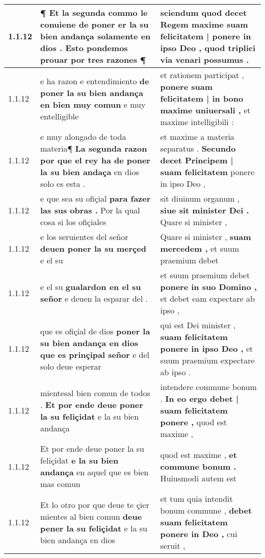 \begin{tabular}{|p{1cm}|p{6.5cm}|p{6.5cm}|}
1.1.12 & ¶ Et la segunda commo le conuiene \textbf{ de poner er la su bien andança solamente en dios . } Esto pondemos prouar por tres razones ¶ & sciendum quod decet Regem maxime \textbf{ suam felicitatem | ponere in ipso Deo , } quod triplici via venari possumus . \\\hline
1.1.12 & e ha razon e entendimiento \textbf{ de poner la su bien andança en bien muy comun } e muy entelligible & et rationem participat , \textbf{ ponere suam felicitatem | in bono maxime uniuersali , } et maxime intelligibili : \\\hline
1.1.12 & e muy alongado de toda materia¶ \textbf{ La segunda razon por que el rey ha de poner la su bien andaça } en dios solo es esta . & et maxime a materia separatus . \textbf{ Secundo decet Principem | suam felicitatem } ponere in ipso Deo , \\\hline
1.1.12 & e que sea su ofiçial \textbf{ para fazer las sus obras . } Por la qual cosa si los ofiçiales & sit diuinum organum , \textbf{ siue sit minister Dei . } Quare si minister , \\\hline
1.1.12 & e los seruientes del señor \textbf{ deuen poner la su merçed } e el su & Quare si minister , \textbf{ suam mercedem , } et suum praemium debet \\\hline
1.1.12 & e el su \textbf{ gualardon en el su señor } e deuen la esparar del . & et suum praemium debet \textbf{ ponere in suo Domino , } et debet eam expectare ab ipso , \\\hline
1.1.12 & que es ofiçial de dios \textbf{ poner la su bien andança en dios que es prinçipal señor } e del solo deue esperar & qui est Dei minister , \textbf{ suam felicitatem ponere in ipso Deo , } et suum praemium expectare ab ipso . \\\hline
1.1.12 & mientesal bien comun de todos . \textbf{ Et por ende deue poner la su feliçidat } e la su bien andança & intendere commune bonum . \textbf{ In eo ergo debet | suam felicitatem ponere , } quod est maxime , \\\hline
1.1.12 & Et por ende deue poner la su feliçidat \textbf{ e la su bien andança } en aquel que es bien mas comun & quod est maxime , \textbf{ et commune bonum . } Huiusmodi autem est \\\hline
1.1.12 & Et lo otro por que deue te çier mientes al bien comun \textbf{ deue pener la su feliçidat } e la su bien andança en dios & et tum quia intendit bonum commune , \textbf{ debet suam felicitatem ponere in Deo , } cui seruit , \\\hline

\end{tabular}
